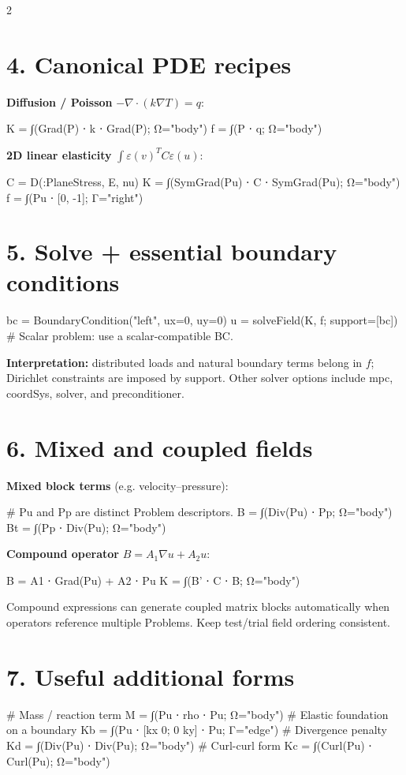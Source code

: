 \documentclass[a4paper,11pt]{extarticle}
\newcommand{\code}[1]{\mbox{\ttfamily\small #1}}
\begin{document}
\begin{multicols}{2}
\section{4. Canonical PDE recipes}
\textbf{Diffusion / Poisson} $-\nabla\cdot(k\nabla T)=q$:
\begin{julia}
K = ∫(Grad(P) ⋅ k ⋅ Grad(P); Ω="body")
f = ∫(P ⋅ q; Ω="body")
\end{julia}
\textbf{2D linear elasticity} $\int\varepsilon(v)^TC\varepsilon(u)$:
\begin{julia}
C = D(:PlaneStress, E, nu)
K = ∫(SymGrad(Pu) ⋅ C ⋅ SymGrad(Pu);
      Ω="body")
f = ∫(Pu ⋅ [0, -1]; Γ="right")
\end{julia}
\columnbreak
\section{5. Solve + essential boundary conditions}
\begin{julia}
bc = BoundaryCondition("left", ux=0, uy=0)
u = solveField(K, f; support=[bc])
# Scalar problem: use a scalar-compatible BC.
\end{julia}
\textbf{Interpretation:} distributed loads and natural boundary terms belong in $f$; Dirichlet constraints are imposed by \code{support}. Other solver options include \code{mpc}, \code{coordSys}, \code{solver}, and \code{preconditioner}.
\section{6. Mixed and coupled fields}
\textbf{Mixed block terms} (e.g. velocity--pressure):
\begin{julia}
# Pu and Pp are distinct Problem descriptors.
B = ∫(Div(Pu) ⋅ Pp; Ω="body")
Bt = ∫(Pp ⋅ Div(Pu); Ω="body")
\end{julia}
\textbf{Compound operator} $B=A_1\nabla u+A_2u$:
\begin{julia}
B = A1 ⋅ Grad(Pu) + A2 ⋅ Pu
K = ∫(B' ⋅ C ⋅ B; Ω="body")
\end{julia}
Compound expressions can generate coupled matrix blocks automatically when operators reference multiple \code{Problem}s. Keep test/trial field ordering consistent.
\section{7. Useful additional forms}
\begin{julia}
# Mass / reaction term
M = ∫(Pu ⋅ rho ⋅ Pu; Ω="body")
# Elastic foundation on a boundary
Kb = ∫(Pu ⋅ [kx 0; 0 ky] ⋅ Pu;
       Γ="edge")
# Divergence penalty
Kd = ∫(Div(Pu) ⋅ Div(Pu); Ω="body")
# Curl-curl form
Kc = ∫(Curl(Pu) ⋅ Curl(Pu); Ω="body")
\end{julia}

\end{multicols}
\end{document}
